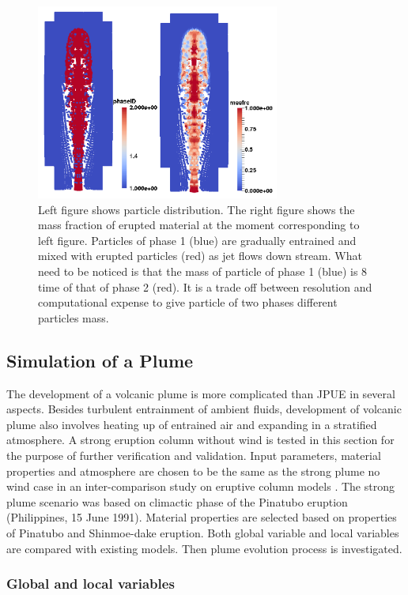 \documentclass[journal abbreviation, manuscript]{copernicus}
\begin{document}
\begin{figure}
\includegraphics[width=8cm]{JPUE_entrainment.png}
\caption{Left figure shows particle distribution. The right figure shows the mass fraction of erupted material at the moment corresponding to left figure. Particles of phase 1 (blue) are gradually entrained and mixed with erupted particles (red) as jet flows down stream. What need to be noticed is that the mass of particle of phase 1 (blue) is 8 time of that of phase 2 (red). It is a trade off between resolution and computational expense to give particle of two phases different particles mass.}
\label{fig:Turb_mixing}
\end{figure}

\subsection{Simulation of a Plume}
The development of a volcanic plume is more complicated than JPUE in several aspects. Besides turbulent entrainment of ambient fluids, development of volcanic plume also involves heating up of entrained air and expanding in a stratified atmosphere. A strong eruption column without wind is tested in this section for the purpose of further verification and validation. Input parameters, material properties and atmosphere are chosen to be the same as the strong plume no wind case in an inter-comparison study on eruptive column models \citep{costa2016results}. The strong plume scenario was based on climactic phase of the Pinatubo eruption (Philippines, 15 June 1991). Material properties are selected based on properties of Pinatubo and Shinmoe-dake eruption. Both global variable and local variables are compared with existing models. Then plume evolution process is investigated.  

\subsubsection{Global and local variables}
\end{document}
